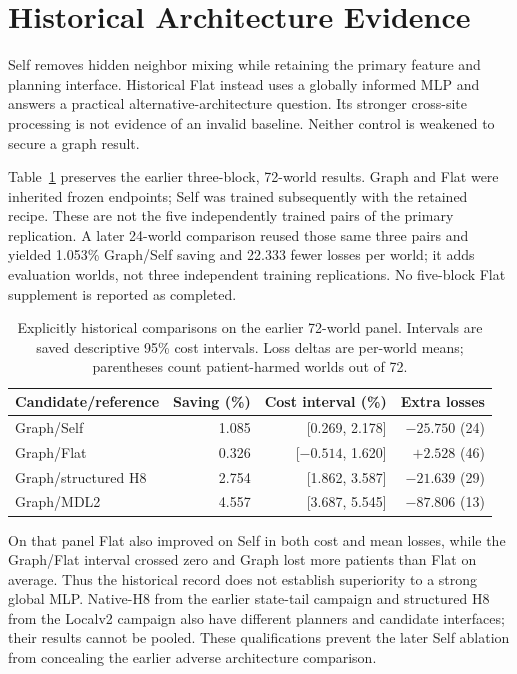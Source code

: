 \documentclass[preprint,12pt]{elsarticle}
\begin{document}
\clearpage
\section{Historical Architecture Evidence}
\label{app:history}
Self removes hidden neighbor mixing while retaining the primary feature and
planning interface. Historical Flat instead uses a globally informed MLP and
answers a practical alternative-architecture question. Its stronger cross-site
processing is not evidence of an invalid baseline. Neither control is weakened
to secure a graph result.

Table~\ref{tab:historical} preserves the earlier three-block, 72-world results.
Graph and Flat were inherited frozen endpoints; Self was trained subsequently
with the retained recipe. These are not the five independently trained pairs
of the primary replication. A later 24-world comparison reused those same
three pairs and yielded 1.053\% Graph/Self saving and 22.333 fewer losses per
world; it adds evaluation worlds, not three independent training replications.
No five-block Flat supplement is reported as completed.

\begin{table}[h]
\centering
\caption{Explicitly historical comparisons on the earlier 72-world panel.
Intervals are saved descriptive 95\% cost intervals. Loss deltas are per-world
means; parentheses count patient-harmed worlds out of 72.}
\label{tab:historical}
\small
\begin{tabular}{lrrr}
\toprule
Candidate/reference & Saving (\%) & Cost interval (\%) & Extra losses\\
\midrule
Graph/Self & 1.085 & [0.269, 2.178] & $-25.750$ (24)\\
Graph/Flat & 0.326 & [$-0.514$, 1.620] & $+2.528$ (46)\\
Graph/structured H8 & 2.754 & [1.862, 3.587] & $-21.639$ (29)\\
Graph/MDL2 & 4.557 & [3.687, 5.545] & $-87.806$ (13)\\
\bottomrule
\end{tabular}
\end{table}

On that panel Flat also improved on Self in both cost and mean losses, while
the Graph/Flat interval crossed zero and Graph lost more patients than Flat on
average. Thus the historical record does not establish superiority to a strong
global MLP. Native-H8 from the earlier state-tail campaign and structured H8
from the Localv2 campaign also have different planners and candidate interfaces;
their results cannot be pooled. These qualifications prevent the later Self
ablation from concealing the earlier adverse architecture comparison.
\end{document}

